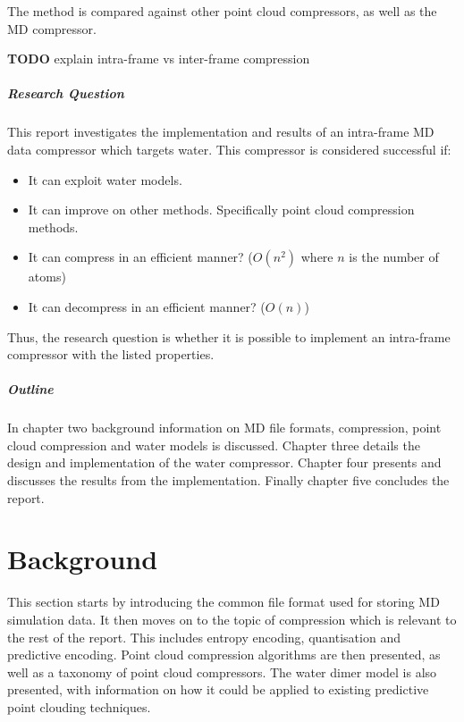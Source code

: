 \documentclass[a4paper]{report}
\newcommand{\todo}{\textbf{TODO} }
\begin{document}
The method is compared against other point cloud compressors, as well as the
\citet{omeltchenko2000sls} MD compressor.

\todo explain intra-frame vs inter-frame compression

\paragraph{Research Question}

This report investigates the implementation and results of an intra-frame MD
data compressor which targets water. This compressor is considered successful if:

\begin{itemize}
  \item It can exploit water models.
  \item It can improve on other methods. Specifically point cloud compression
    methods.
  \item It can compress in an efficient manner? ($O(n^2)$ where $n$ is the
    number of atoms)
  \item It can decompress in an efficient manner? ($O(n)$)
\end{itemize}

Thus, the research question is whether it is possible to implement an
intra-frame compressor with the listed properties.


\paragraph{Outline}

In chapter two background information on MD file formats, compression, point
cloud compression and water models is discussed. Chapter three details the
design and implementation of the water compressor. Chapter four presents and
discusses the results from the implementation. Finally chapter five concludes
the report.



\chapter{Background}

This section starts by introducing the common file format used for storing MD
simulation data. It then moves on to the topic of compression which is
relevant to the rest of the report. This includes entropy encoding,
quantisation and predictive encoding. Point cloud compression algorithms are
then presented, as well as a taxonomy of point cloud compressors. The water
dimer model is also presented, with information on how it could be applied to
existing predictive point clouding techniques.
\end{document}
